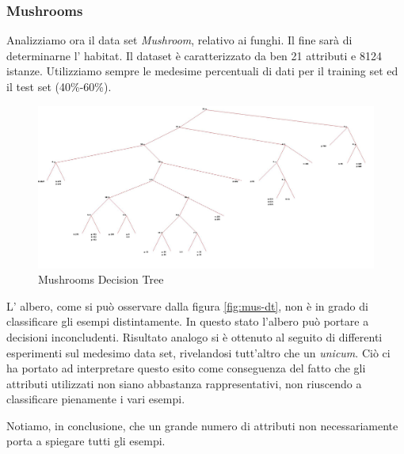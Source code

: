 		\subsubsection{Mushrooms} 
			Analizziamo ora il data set \emph{Mushroom}, relativo ai funghi. Il fine sarà di determinarne l' habitat. Il dataset è caratterizzato da ben 21 attributi e 8124 istanze. Utilizziamo sempre le medesime percentuali di dati per il training set ed il test set (40\%-60\%).
			
			\begin{figure}
				\includegraphics[width=1.2\textwidth, height=0.9\textheight]{mushroom.jpg}
				\caption{Mushrooms Decision Tree}
				\label{fig:mus-dt}
			\end{figure}
			
					
			L' albero, come si può osservare dalla figura \vref{fig:mus-dt}, non è in grado di classificare gli esempi distintamente. In questo stato l'albero può portare a decisioni inconcludenti. Risultato analogo si è ottenuto al seguito di differenti esperimenti sul medesimo data set, rivelandosi tutt'altro che un \textit{unicum}. Ciò ci ha portato ad interpretare questo esito come conseguenza del fatto che gli attributi utilizzati non siano abbastanza rappresentativi, non riuscendo a classificare pienamente i vari esempi.
			
		    
			Notiamo, in conclusione, che un grande numero di attributi non necessariamente porta a spiegare tutti gli esempi.
			
